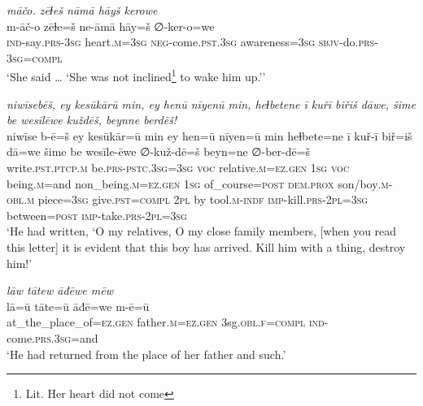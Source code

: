 \ea \label{KŠ.69}
\textit{māčo. zēɫeš nāmā hāyš kerowe} \\ 
\gll m-āč-o zēɫe=š ne-āmā hāy=š ∅-ker-o=we \\ 
 \textsc{ind-}say\textsc{.prs}\textsc{-3sg} heart\textsc{.m}\textsc{=3sg} \textsc{neg-}come\textsc{.pst}\textsc{.3sg} awareness\textsc{=3sg} \textsc{sbjv-}do\textsc{.prs}\textsc{-3sg}\textsc{=compl} \\ 
\glt `She said … ‘She was not inclined\footnote{Lit. Her heart did not come} to wake him up.’'
\z 
 
\ea \label{KŠ.72}
\textit{niwīsebēš, ey kesūkārū min, ey henū nīyenū min, heɫbetene ī kuřī biřiš dāwe, šime be wesīlēwe kuždēš, beynne berdēš!} \\ 
\gll niwīse b-ē=š ey kesūkār=ū min ey hen=ū nīyen=ū min heɫbete=ne ī kuř-ī biř=iš dā=we šime be wesīle-ēwe ∅-kuž-dē=š beyn=ne ∅-ber-dē=š \\ 
 write\textsc{.pst}\textsc{.ptcp}\textsc{.m} be\textsc{.prs}\textsc{-pstc}\textsc{.3sg}\textsc{=3sg} \textsc{voc} relative\textsc{.m}\textsc{\textsc{=ez.gen}} \textsc{1sg} \textsc{voc} being\textsc{.m}=and non\_being\textsc{.m}\textsc{\textsc{=ez.gen}} \textsc{1sg} of\_course\textsc{=\textsc{post}} \textsc{dem.prox} son/boy\textsc{.m}\textsc{-obl}\textsc{.m} piece\textsc{=3sg} give\textsc{.pst}\textsc{=compl} \textsc{2pl} by tool\textsc{.m}\textsc{-indf} \textsc{imp-}kill\textsc{.prs}-\textsc{2pl}\textsc{=3sg} between\textsc{=\textsc{post}} \textsc{imp-}take\textsc{.prs}-\textsc{2pl}\textsc{=3sg} \\ 
\glt `He had written, ‘O my relatives, O my close family members, [when you read this letter] it is evident that this boy has arrived. Kill him with a thing, destroy him!'
\z 
 
\ea \label{KŠ.75}
\textit{lāw tātew āđēwe mēw} \\ 
\gll lā=ū tāte=ū āđē=we m-ē=ū \\ 
 at\_the\_place\_of\textsc{\textsc{=ez.gen}} father\textsc{.m}\textsc{\textsc{=ez.gen}} 3sg\textsc{.obl}\textsc{.f}\textsc{=compl} \textsc{ind-}come\textsc{.prs}\textsc{.3sg}=and \\ 
\glt `He had returned from the place of her father and such.'
\z 
 
